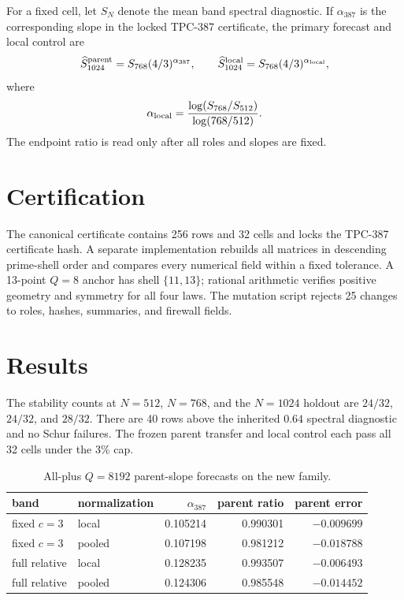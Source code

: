 \documentclass[10pt]{article}
\begin{document}
For a fixed cell, let $S_N$ denote the mean band spectral diagnostic.  If
$\alpha_{387}$ is the corresponding slope in the locked TPC-387 certificate,
the primary forecast and local control are
\[
 \widehat S_{1024}^{\rm parent}=S_{768}(4/3)^{\alpha_{387}},
 \qquad
 \widehat S_{1024}^{\rm local}=S_{768}(4/3)^{\alpha_{\rm local}},
\]
where
\[
 \alpha_{\rm local}=\frac{\log(S_{768}/S_{512})}{\log(768/512)}.
\]
The endpoint ratio is read only after all roles and slopes are fixed.

\section{Certification}

The canonical certificate contains 256 rows and 32 cells and locks the
TPC-387 certificate hash.  A separate implementation rebuilds all matrices
in descending prime-shell order and compares every numerical field within a
fixed tolerance.  A 13-point $Q=8$ anchor has shell $\{11,13\}$; rational
arithmetic verifies positive geometry and symmetry for all four laws.  The
mutation script rejects 25 changes to roles, hashes, summaries, and firewall
fields.

\section{Results}

The stability counts at $N=512$, $N=768$, and the $N=1024$ holdout are
$24/32$, $24/32$, and $28/32$.  There are 40 rows above the inherited
$0.64$ spectral diagnostic and no Schur failures.  The frozen parent transfer
and local control each pass all 32 cells under the 3\% cap.

\begin{table}[t]
\centering
\caption{All-plus $Q=8192$ parent-slope forecasts on the new family.}
\small
\begin{tabular}{@{}l l r r r@{}}
\toprule
band & normalization & $\alpha_{387}$ & parent ratio & parent error\\
\midrule
fixed $c=3$ & local & 0.105214 & 0.990301 & $-0.009699$\\
fixed $c=3$ & pooled & 0.107198 & 0.981212 & $-0.018788$\\
full relative & local & 0.128235 & 0.993507 & $-0.006493$\\
full relative & pooled & 0.124306 & 0.985548 & $-0.014452$\\
\bottomrule
\end{tabular}
\end{table}
\end{document}
